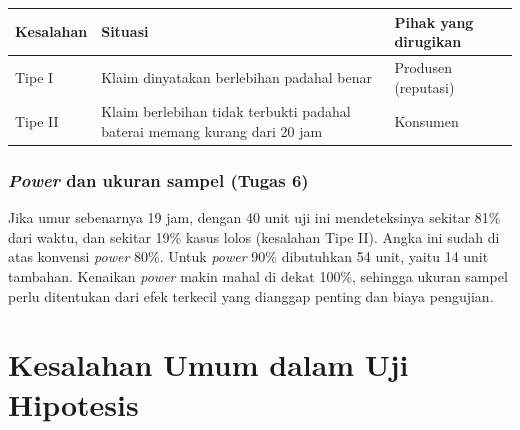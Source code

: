 \documentclass[
  indonesian,
  letterpaper,
]{book}
\newcounter{none} %
\begin{document}
{\def\LTcaptype{none} %
\begin{longtable}[]{@{}
  >{\raggedright\arraybackslash}p{}
  >{\raggedright\arraybackslash}p{}
  >{\raggedright\arraybackslash}p{}@{}}
\toprule\noalign{}
\begin{minipage}[b]{\linewidth}\raggedright
Kesalahan
\end{minipage} & \begin{minipage}[b]{\linewidth}\raggedright
Situasi
\end{minipage} & \begin{minipage}[b]{\linewidth}\raggedright
Pihak yang dirugikan
\end{minipage} \\
\midrule\noalign{}
\endhead
\bottomrule\noalign{}
\endlastfoot
Tipe I & Klaim dinyatakan berlebihan padahal benar & Produsen
(reputasi) \\
Tipe II & Klaim berlebihan tidak terbukti padahal baterai memang kurang
dari 20 jam & Konsumen \\
\end{longtable}
}

\subsection{\texorpdfstring{\emph{Power} dan ukuran sampel (Tugas
6)}{Power dan ukuran sampel (Tugas 6)}}\label{power-dan-ukuran-sampel-tugas-6}

Jika umur sebenarnya 19 jam, dengan 40 unit uji ini mendeteksinya
sekitar 81\% dari waktu, dan sekitar 19\% kasus lolos (kesalahan Tipe
II). Angka ini sudah di atas konvensi \emph{power} 80\%. Untuk
\emph{power} 90\% dibutuhkan 54 unit, yaitu 14 unit tambahan. Kenaikan
\emph{power} makin mahal di dekat 100\%, sehingga ukuran sampel perlu
ditentukan dari efek terkecil yang dianggap penting dan biaya pengujian.


\chapter{Kesalahan Umum dalam Uji
Hipotesis}\label{kesalahan-umum-dalam-uji-hipotesis}
\end{document}
